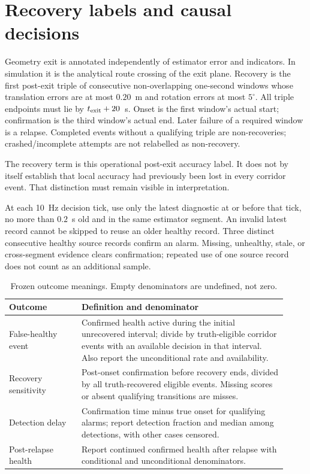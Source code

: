\documentclass[11pt,a4paper]{article}
\begin{document}
\section{Recovery labels and causal decisions}
Geometry exit is annotated independently of estimator error and indicators.
In simulation it is the analytical route crossing of the exit plane. Recovery
is the first post-exit triple of consecutive non-overlapping one-second
windows whose translation errors are at most $0.20$~m and rotation errors at
most $5^\circ$. All triple endpoints must lie by $t_{\rm exit}+20$~s.
Onset is the first window's actual start; confirmation is the third window's
actual end. Later failure of a required window is a relapse. Completed events
without a qualifying triple are non-recoveries; crashed/incomplete attempts
are not relabelled as non-recovery.

The recovery term is this operational post-exit accuracy label. It does not
by itself establish that local accuracy had previously been lost in every
corridor event. That distinction must remain visible in interpretation.

At each 10~Hz decision tick, use only the latest diagnostic at or before that
tick, no more than $0.2$~s old and in the same estimator segment. An invalid
latest record cannot be skipped to reuse an older healthy record. Three
distinct consecutive healthy source records confirm an alarm. Missing,
unhealthy, stale, or cross-segment evidence clears confirmation; repeated
use of one source record does not count as an additional sample.

\begin{table}[ht]
\centering\small
\begin{tabular}{p{0.24\linewidth}p{0.68\linewidth}}
\toprule Outcome & Definition and denominator\\\midrule
False-healthy event & Confirmed health active during the initial unrecovered
interval; divide by truth-eligible corridor events with an available decision
in that interval. Also report the unconditional rate and availability.\\
Recovery sensitivity & Post-onset confirmation before recovery ends, divided
by all truth-recovered eligible events. Missing scores or absent qualifying
transitions are misses.\\
Detection delay & Confirmation time minus true onset for qualifying alarms;
report detection fraction and median among detections, with other cases censored.\\
Post-relapse health & Report continued confirmed health after relapse with
conditional and unconditional denominators.\\
\bottomrule
\end{tabular}
\caption{Frozen outcome meanings. Empty denominators are undefined, not zero.}
\end{table}
\end{document}
